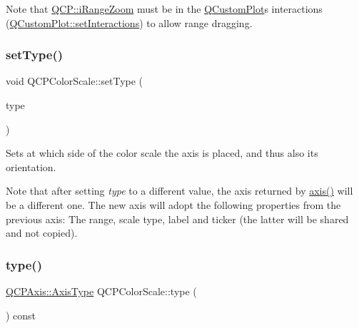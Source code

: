 Note that \mbox{\hyperlink{namespace_q_c_p_a2ad6bb6281c7c2d593d4277b44c2b037abee1e94353525a636aeaf0ba32b72e14}{Q\+C\+P\+::i\+Range\+Zoom}} must be in the \mbox{\hyperlink{class_q_custom_plot}{Q\+Custom\+Plot}}\textquotesingle{}s interactions (\mbox{\hyperlink{class_q_custom_plot_a5ee1e2f6ae27419deca53e75907c27e5}{Q\+Custom\+Plot\+::set\+Interactions}}) to allow range dragging. \mbox{\label{class_q_c_p_color_scale_a1bf9bdb291927c422dd66b404b206f1f}} 
\subsubsection{\texorpdfstring{setType()}{setType()}}
{\footnotesize\ttfamily void Q\+C\+P\+Color\+Scale\+::set\+Type (\begin{DoxyParamCaption}\item[{\mbox{\hyperlink{class_q_c_p_axis_ae2bcc1728b382f10f064612b368bc18a}{Q\+C\+P\+Axis\+::\+Axis\+Type}}}]{type }\end{DoxyParamCaption})}

Sets at which side of the color scale the axis is placed, and thus also its orientation.

Note that after setting {\itshape type} to a different value, the axis returned by \mbox{\hyperlink{class_q_c_p_color_scale_a39bdbdb3b212602a5a57f9f3ea444190}{axis()}} will be a different one. The new axis will adopt the following properties from the previous axis\+: The range, scale type, label and ticker (the latter will be shared and not copied). \mbox{\label{class_q_c_p_color_scale_a85d7e286fbfc0c04c4b480aff3cb66fb}} 
\subsubsection{\texorpdfstring{type()}{type()}}
{\footnotesize\ttfamily \mbox{\hyperlink{class_q_c_p_axis_ae2bcc1728b382f10f064612b368bc18a}{Q\+C\+P\+Axis\+::\+Axis\+Type}} Q\+C\+P\+Color\+Scale\+::type (\begin{DoxyParamCaption}{ }\end{DoxyParamCaption}) const\hspace{0.3cm}{\ttfamily [inline]}}

\mbox{\label{class_q_c_p_color_scale_a259dcb6d3053a2cc3c197e9b1191ddbe}} 
